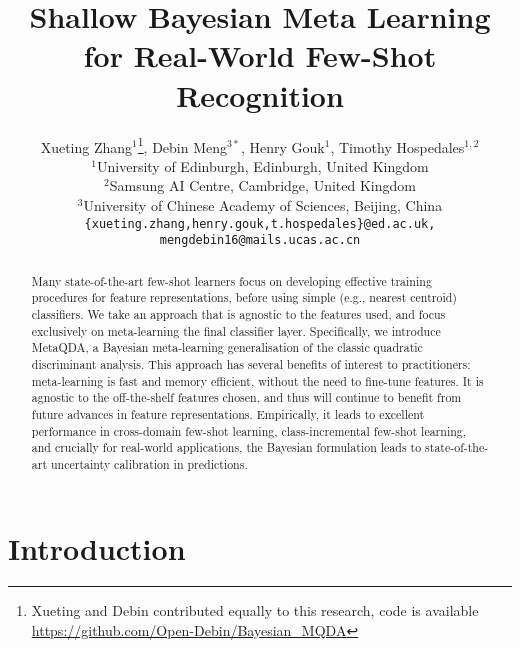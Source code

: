 \documentclass[10pt,twocolumn,letterpaper]{article}
\begin{document}
\title{Shallow Bayesian Meta Learning for Real-World Few-Shot Recognition}

\author{Xueting Zhang$^{1}$\thanks{Xueting and Debin contributed equally to this research, code is available \url{https://github.com/Open-Debin/Bayesian_MQDA} }, 
Debin Meng$^{3*}$, Henry Gouk$^{1}$, Timothy Hospedales$^{1,2}$
\\
$^{1}$University of Edinburgh, Edinburgh, United Kingdom\\
$^{2}$Samsung AI Centre, Cambridge, United Kingdom\\
$^{3}$University of Chinese Academy of Sciences, Beijing, China \\
{\tt\small \{xueting.zhang,henry.gouk,t.hospedales\}@ed.ac.uk, mengdebin16@mails.ucas.ac.cn}
}



\maketitle
\ificcvfinal\thispagestyle{empty}\fi

\begin{abstract}
Many state-of-the-art few-shot learners focus on developing effective training procedures for feature representations, before using simple (e.g., nearest centroid) classifiers. We take an approach that is agnostic to the features used, and focus exclusively on meta-learning the final classifier layer. Specifically, we introduce MetaQDA, a Bayesian meta-learning generalisation of the classic quadratic discriminant analysis. This approach has several benefits of interest to practitioners: meta-learning is fast and memory efficient, without the need to fine-tune features. It is agnostic to the off-the-shelf features chosen, and thus will continue to benefit from future advances in feature representations. Empirically, it leads to excellent performance in cross-domain few-shot learning, class-incremental few-shot learning, and crucially for real-world applications, the Bayesian formulation leads to state-of-the-art uncertainty calibration in predictions.
\end{abstract}

\section{Introduction}
\end{document}
